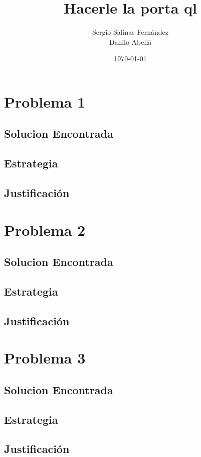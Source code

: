 \documentclass[12pt]{article}
\title{Hacerle la porta ql}								%
\author{Sergio Salinas Fern\'andez \\
Danilo Abellá}								%
\date{\today}											%
\begin{document}
\maketitle


\tableofcontents
\pagebreak



\section{Problema 1}

\subsection{Solucion Encontrada}



\subsection{Estrategia}

\subsection{Justificación}

\section{Problema 2}

\subsection{Solucion Encontrada}

\subsection{Estrategia}

\subsection{Justificación}

\section{Problema 3}

\subsection{Solucion Encontrada}

\subsection{Estrategia}

\subsection{Justificación}
\end{document}
